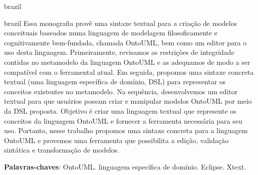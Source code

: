 \documentclass[
  10pt,				%
  oneside,
  a4paper,			%
  brazilian,
  english
]{abntex2}
\begin{document}
\begin{agradecimentos}
  \begin{otherlanguage*}{brazil}
  \end{otherlanguage*}
\end{agradecimentos}



\setlength{\absparsep}{18pt} %
\begin{resumo}
  \begin{otherlanguage*}{brazil}
    Essa monografia provê uma sintaxe textual para a criação de modelos conceituais
    baseados numa linguagem de modelagem filosoficamente e cognitivamente bem-fundada,
    chamada OntoUML, bem como um editor para o uso desta linguagem.
%
    Primeiramente, revisamos as restrições de integridade contidas no metamodelo
    da linguagem OntoUML e as adequamos de modo a ser compatível com o ferramental atual.
%
    Em seguida, propomos uma sintaxe concreta textual (uma linguagem específica de domínio, DSL)
    para representar os conceitos existentes no metamodelo.
%
    Na sequência, desenvolvemos um editor textual para que usuários possam criar e
    manipular modelos OntoUML por meio da DSL proposta.
%
    Objetivo é criar uma linguagem textual que represente os conceitos da linguagem
    OntoUML e fornecer a ferramenta necessária para seu uso.
%
    Portanto, nesse trabalho propomos uma sintaxe concreta para a linguagem OntoUML
    e provemos uma ferramenta que possibilita a edição, validação sintática e
    transformação de modelos.

    \textbf{Palavras-chaves}: OntoUML. linguagem específica de domínio. Eclipse. Xtext.
  \end{otherlanguage*}
\end{resumo}
\end{document}
